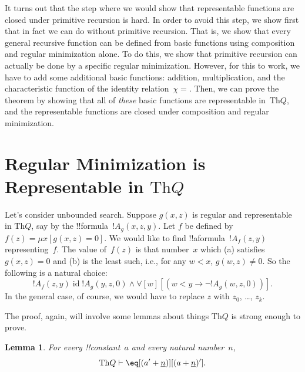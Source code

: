 \documentclass[10pt,a4paper]{article}
\theoremstyle{plain}
\newtheorem{lem}[thm]{Lemma}
\theoremstyle{definition}
\theoremstyle{remark}
\newcommand*{\olfileid}[3]{}
\newcommand*{\olsection}[1]{\section*{#1}}
\newcommand*{\ollabel}[1]{\label{#1}}
\providecommand{\lif}{\mathbin{\rightarrow}}
\providecommand{\lforall}{\mathord{\forall}}
\providecommand{\Proves}{\mathrel{\vdash}}
\providecommand{\Obj}{}
\providecommand{\Th}{\ensuremath{\mathrm{Th}}}
\providecommand{\num}[1]{\underline{#1}}
\providecommand{\Char}{\chi}
\providecommand{\umin}{\mu}
\providecommand{\ident}{\operatorname{id}}
\begin{document}
It turns out that the step where we would show that representable
functions are closed under primitive recursion is hard. In order to
avoid this step, we show first that in fact we can do without
primitive recursion. That is, we show that every general recursive
function can be defined from basic functions using composition and
regular minimization alone.  To do this, we show that primitive
recursion can actually be done by a specific regular minimization.
However, for this to work, we have to add some additional basic
functions: addition, multiplication, and the characteristic function
of the identity relation~$\Char{=}$.  Then, we can prove the theorem
by showing that all of \emph{these} basic functions are representable
in~$\Th{Q}$, and the representable functions are closed under
composition and regular minimization.





\olfileid{inc}{req}{min}
\olsection{Regular Minimization is Representable in $\Th{Q}$}

Let's consider unbounded search. Suppose $g(x, z)$ is regular and
representable in $\Th{Q}$, say by the !!{formula}~$!A_g(x, z, y)$. Let
$f$ be defined by $f(z) = \umin{x}{[g(x, z) = 0]}$. We would like to find
!!a{formula}~$!A_f(z, y)$ representing~$f$.  The value of~$f(z)$ is
that number~$x$ which (a) satisfies $g(x, z) = 0$ and (b) is the least
such, i.e., for any $w < x$, $g(w, z) \neq 0$.  So the following is a
natural choice:
\[
!A_f(z,y) \ident !A_g(y, z, \Obj 0) \land \lforall[w][(w < y \lif \lnot
  !A_g(w, z, \Obj 0))].
\]
In the general case, of course, we would have to replace $z$ with
$z_0$, \dots, $z_k$.

The proof, again, will involve some lemmas about things $\Th{Q}$ is
strong enough to prove.

\begin{lem}
\ollabel{lem:succ} For every !!{constant}~$a$ and every natural
number~$n$,
\[
\Th{Q} \Proves \eq[(a' + \num n)][(a + \num n)'].
\]
\end{lem}
\end{document}
